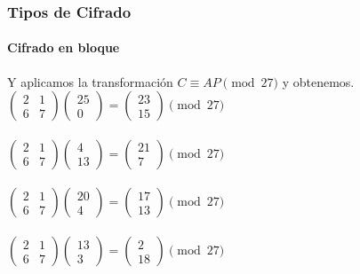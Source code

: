 \documentclass[spanish, mexico]{beamer}
\begin{document}
	\begin{frame}
		\frametitle{Tipos de Cifrado}
		\framesubtitle{Cifrado en bloque}
		 \begin{solution}
		    Y aplicamos la transformación $C \equiv AP \pmod{27}$ y obtenemos.
		    $
		    \begin{pmatrix}2 & 1\\ 6 & 7\end{pmatrix}
		    \begin{pmatrix}25\\0\end{pmatrix} = \begin{pmatrix}23\\15\end{pmatrix} \pmod{27}
		    $\\~\\
		    $
		    \begin{pmatrix}2 & 1\\ 6 & 7\end{pmatrix}
		    \begin{pmatrix}4\\13\end{pmatrix} = \begin{pmatrix}21\\7\end{pmatrix} \pmod{27}
		    $\\~\\
		    $
		    \begin{pmatrix}2 & 1\\ 6 & 7\end{pmatrix}
		    \begin{pmatrix}20\\4\end{pmatrix} = \begin{pmatrix}17\\13\end{pmatrix} \pmod{27}
		    $\\~\\
		    $
		    \begin{pmatrix}2 & 1\\ 6 & 7\end{pmatrix}
		    \begin{pmatrix}13\\3\end{pmatrix} = \begin{pmatrix}2\\18\end{pmatrix} \pmod{27}
		    $\\~\\

\end{solution}
\end{frame}
\end{document}
